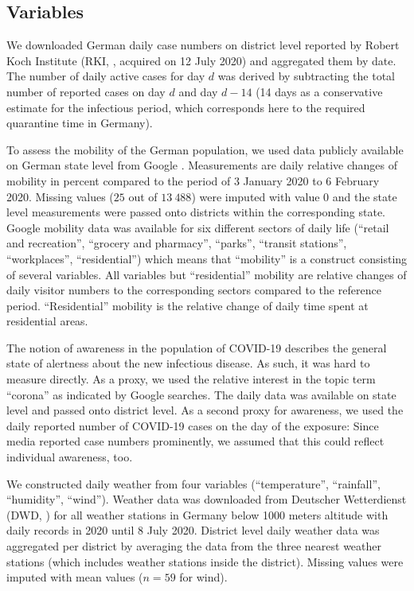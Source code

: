 \documentclass[]{elsarticle} %
\begin{document}
\subsection{Variables}\label{variables}

We downloaded German daily case numbers on district level reported by
Robert Koch Institute (RKI, \citep{casenumbers_rki}, acquired on 12 July
2020) and aggregated them by date. The number of daily active cases for
day \(d\) was derived by subtracting the total number of reported cases
on day \(d\) and day \(d-14\) (14 days as a conservative estimate for
the infectious period, which corresponds here to the required quarantine
time in Germany).

To assess the mobility of the German population, we used data publicly
available on German state level from Google \citep{google_mobility}.
Measurements are daily relative changes of mobility in percent compared
to the period of 3 January 2020 to 6 February 2020. Missing values
(\(25\) out of \(13{\ }488\)) were imputed with value \(0\) and the
state level measurements were passed onto districts within the
corresponding state. Google mobility data was available for six
different sectors of daily life (``retail and recreation'', ``grocery
and pharmacy'', ``parks'', ``transit stations'', ``workplaces'',
``residential'') which means that ``mobility'' is a construct consisting
of several variables. All variables but ``residential'' mobility are
relative changes of daily visitor numbers to the corresponding sectors
compared to the reference period. ``Residential'' mobility is the
relative change of daily time spent at residential areas.

The notion of awareness in the population of COVID-19 describes the
general state of alertness about the new infectious disease. As such, it
was hard to measure directly. As a proxy, we used the relative interest
in the topic term ``corona'' as indicated by Google searches. The daily
data was available on state level \citep{google_trends} and passed onto
district level. As a second proxy for awareness, we used the daily
reported number of COVID-19 cases on the day of the exposure: Since
media reported case numbers prominently, we assumed that this could
reflect individual awareness, too.

We constructed daily weather from four variables (``temperature'',
``rainfall'', ``humidity'', ``wind''). Weather data was downloaded from
Deutscher Wetterdienst (DWD, \citep{dwd_weather}) for all weather
stations in Germany below 1000 meters altitude with daily records in
2020 until 8 July 2020. District level daily weather data was aggregated
per district by averaging the data from the three nearest weather
stations (which includes weather stations inside the district). Missing
values were imputed with mean values (\(n=59\) for wind).
\end{document}
